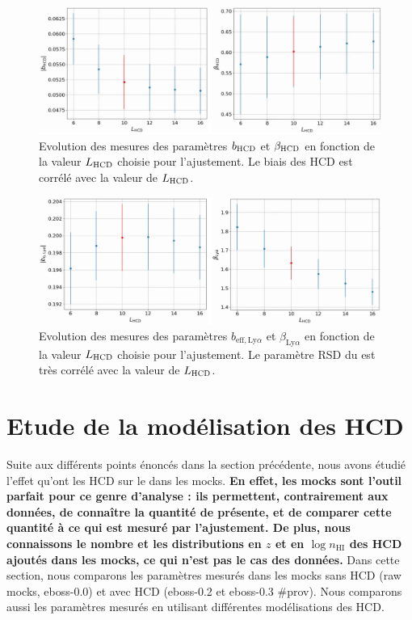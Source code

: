 \documentclass[11pt, twoside, a4paper, openright]{report}
\begin{document}
\begin{figure}
  \centering
  \includegraphics[scale=0.45]{bias_hcd_vs_L0}
  \caption{Evolution des mesures des paramètres $b_{\textsc{HCD}}$ et $\beta_{\textsc{HCD}}$ en fonction de la valeur $L_{\textsc{HCD}}$ choisie pour l'ajustement. Le biais des HCD est corrélé avec la valeur de $L_{\textsc{HCD}}$.}
  \label{fig:bias_hcd_vs_L0}
\end{figure}
\begin{figure}
  \centering
  \includegraphics[scale=0.45]{bias_lya_vs_L0}
  \caption{Evolution des mesures des paramètres $b_{\mathrm{eff},\mathrm{Ly}\alpha}$ et $\beta_{\mathrm{Ly}\alpha}$ en fonction de la valeur $L_{\textsc{HCD}}$ choisie pour l'ajustement. Le paramètre RSD du \lya{} est très corrélé avec la valeur de $L_{\textsc{HCD}}$.}
  \label{fig:bias_lya_vs_L0}
\end{figure}


\section{Etude de la modélisation des HCD}
\label{sec:etude_model_hcd}
Suite aux différents points énoncés dans la section précédente, nous avons étudié l'effet qu'ont les HCD sur le \lya{} dans les mocks.
\textbf{En effet, les mocks sont l'outil parfait pour ce genre d'analyse : ils permettent, contrairement aux données, de connaître la quantité de \lya{} présente, et de comparer cette quantité à ce qui est mesuré par l'ajustement. De plus, nous connaissons le nombre et les distributions en $z$ et en $\log n_{\mathrm{HI}}$ des HCD ajoutés dans les mocks, ce qui n'est pas le cas des données.}
Dans cette section, nous comparons les paramètres \lya{} mesurés dans les mocks sans HCD (raw mocks, eboss-0.0) et avec HCD (eboss-0.2 et eboss-0.3 \#prov). Nous comparons aussi les paramètres \lya{} mesurés en utilisant différentes modélisations des HCD.
\end{document}
